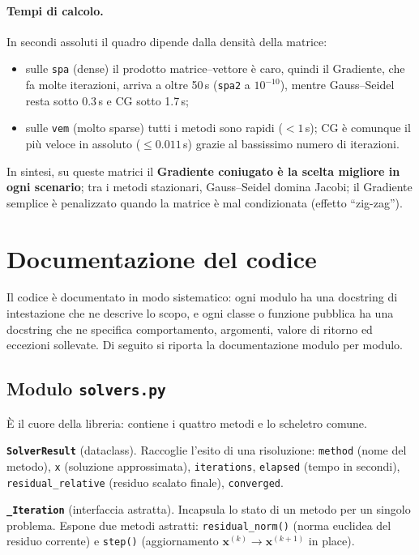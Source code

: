 \documentclass[11pt,a4paper]{article}
\begin{document}
\paragraph{Tempi di calcolo.}
In secondi assoluti il quadro dipende dalla densità della matrice:
\begin{itemize}[leftmargin=1.6em]
  \item sulle \texttt{spa} (dense) il prodotto matrice--vettore è caro, quindi il
  Gradiente, che fa molte iterazioni, arriva a oltre 50\,s (\texttt{spa2} a
  $10^{-10}$), mentre Gauss--Seidel resta sotto 0.3\,s e CG sotto 1.7\,s;
  \item sulle \texttt{vem} (molto sparse) tutti i metodi sono rapidi ($<1$\,s); CG
  è comunque il più veloce in assoluto ($\le0.011$\,s) grazie al bassissimo
  numero di iterazioni.
\end{itemize}

In sintesi, su queste matrici il \textbf{Gradiente coniugato è la scelta migliore
in ogni scenario}; tra i metodi stazionari, Gauss--Seidel domina Jacobi; il
Gradiente semplice è penalizzato quando la matrice è mal condizionata (effetto
``zig-zag'').

\section{Documentazione del codice}
Il codice è documentato in modo sistematico: ogni modulo ha una docstring di
intestazione che ne descrive lo scopo, e ogni classe o funzione pubblica ha una
docstring che ne specifica comportamento, argomenti, valore di ritorno ed
eccezioni sollevate. Di seguito si riporta la documentazione modulo per modulo.

\subsection{Modulo \texttt{solvers.py}}
È il cuore della libreria: contiene i quattro metodi e lo scheletro comune.

\noindent\textbf{\texttt{SolverResult}} (dataclass). Raccoglie l'esito di una
risoluzione: \texttt{method} (nome del metodo), \texttt{x} (soluzione
approssimata), \texttt{iterations}, \texttt{elapsed} (tempo in secondi),
\texttt{residual\_relative} (residuo scalato finale), \texttt{converged}.

\noindent\textbf{\texttt{\_Iteration}} (interfaccia astratta). Incapsula lo stato
di un metodo per un singolo problema. Espone due metodi astratti:
\texttt{residual\_norm()} (norma euclidea del residuo corrente) e \texttt{step()}
(aggiornamento $\mathbf{x}^{(k)}\to\mathbf{x}^{(k+1)}$ in place).
\end{document}
